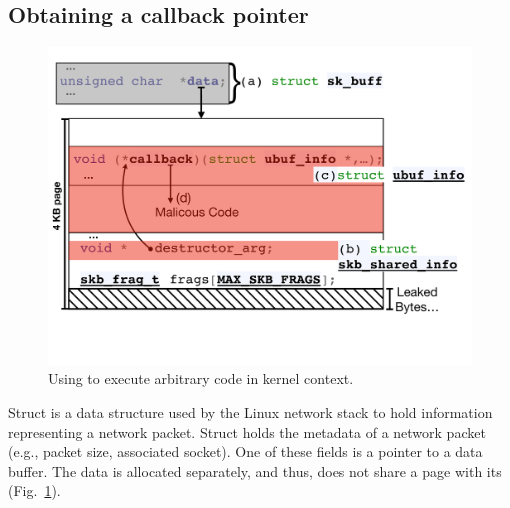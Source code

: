 
\subsection{Obtaining a callback pointer}\label{sec:shinfo_exploit}
\begin{figure}[t]
    \centering
    \includegraphics[width=0.8\linewidth]{figs/ubuf.pdf}
    \caption{Using \shinfo{} to execute arbitrary code in kernel context.}
    \label{fig:sh_info}
\end{figure}

Struct \skb{} is a data structure used by the Linux network stack to hold information representing a network packet. Struct \skb{} holds the metadata of a network packet (e.g., packet size, associated socket). One of these fields is a pointer to a data buffer. The data is allocated separately, and thus, does not share a page with its \skb{} (Fig.~\ref{fig:sh_info}). 

